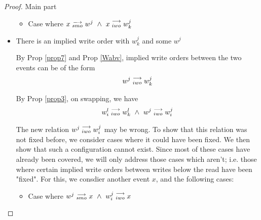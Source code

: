 \begin{proof}{Main part}
\begin{itemize}
\begin{itemize}

                            \item Case where $x\stackrel{\longrightarrow}{_{smo}}w^j \ \wedge \ x\stackrel{\longrightarrow}{_{iwo}}w_k^j$
                        \end{itemize}



                    \item There is an implied write order with $w_k^j$ and some $w^j$

                        By Prop \ref{prop7} and Prop \ref{Wabv}, implied write orders between the two events can be of the form 
                        \begin{align*}
                            w^j\stackrel{\longrightarrow}{_{iwo}}w_k^j  
                        \end{align*}

                        By Prop \ref{prop3}, on swapping, we have 
                        \begin{align*}
                            \reln{w_i^l}{iwo}{w_k^l} \ \wedge \ \reln{w^j}{iwo}{w_i^j}
                        \end{align*}

                        The new relation $w^j\stackrel{\longrightarrow}{_{iwo}}w_i^j$ may be wrong. 
                        To show that this relation was not fixed before, we consider cases where it could have been fixed. We then show that such a configuration cannot exist. Since most of these cases have already been covered, we will only address those cases which aren't; i.e. those where certain implied write orders between writes below the read have been "fixed". For this, we consdier another event $x$, and the following cases:

                        \begin{itemize}
                            \item Case where $w^j\stackrel{\longrightarrow}{_{smo}}x \ \wedge \ w_i^j\stackrel{\longrightarrow}{_{iwo}}x$
                                

\end{itemize}
\end{itemize}
\end{proof}
